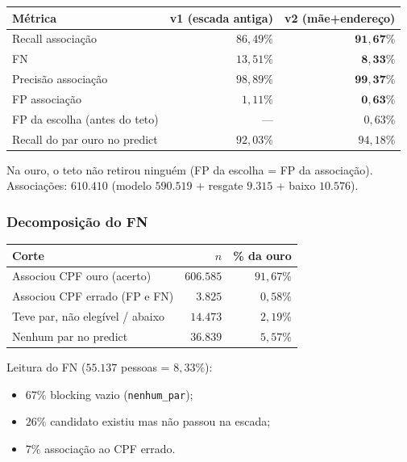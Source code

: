 \documentclass[11pt,a4paper]{article}
\begin{document}
\begin{center}
\begin{tabular}{@{}lrr@{}}
\toprule
Métrica & v1 (escada antiga) & v2 (mãe+endereço) \\
\midrule
Recall associação & $86{,}49\%$ & $\mathbf{91{,}67\%}$ \\
FN & $13{,}51\%$ & $\mathbf{8{,}33\%}$ \\
Precisão associação & $98{,}89\%$ & $\mathbf{99{,}37\%}$ \\
FP associação & $1{,}11\%$ & $\mathbf{0{,}63\%}$ \\
FP da escolha (antes do teto) & --- & $0{,}63\%$ \\
Recall do par ouro no predict & $92{,}03\%$ & $94{,}18\%$ \\
\bottomrule
\end{tabular}
\end{center}

Na ouro, o teto não retirou ninguém (FP da escolha = FP da associação).
Associações: $610{.}410$ (modelo $590{.}519$ + resgate $9{.}315$ + baixo
$10{.}576$).

\subsubsection{Decomposição do FN}

\begin{center}
\begin{tabular}{@{}lrr@{}}
\toprule
Corte & $n$ & \% da ouro \\
\midrule
Associou CPF ouro (acerto) & $606{.}585$ & $91{,}67\%$ \\
Associou CPF errado (FP e FN) & $3{.}825$ & $0{,}58\%$ \\
Teve par, não elegível / abaixo & $14{.}473$ & $2{,}19\%$ \\
Nenhum par no predict & $36{.}839$ & $5{,}57\%$ \\
\bottomrule
\end{tabular}
\end{center}

Leitura do FN ($55{.}137$ pessoas = $8{,}33\%$):
\begin{itemize}
  \item $67\%$ blocking vazio (\texttt{nenhum\_par});
  \item $26\%$ candidato existiu mas não passou na escada;
  \item $7\%$ associação ao CPF errado.
\end{itemize}
\end{document}
